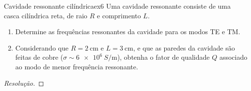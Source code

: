 \begin{exercício}{Cavidade ressonante cilíndrica}{ex6}
    Uma cavidade ressonante consiste de uma casca cilíndrica reta, de raio \(R\) e comprimento \(L\).
    \begin{enumerate}[label=(\alph*)]
        \item Determine as frequências ressonantes da cavidade para os modos TE e TM.
        \item Considerando que \(R = \SI{2}{\centi\meter}\) e \(L = \SI{3}{\centi\meter}\), e que as paredes da cavidade são feitas de cobre (\(\sigma \sim \SI{6e6}{S\per\meter}\)), obtenha o fator de qualidade \(Q\) associado ao modo de menor frequência ressonante.
    \end{enumerate}
\end{exercício}
\begin{proof}[Resolução]
    
\end{proof}

